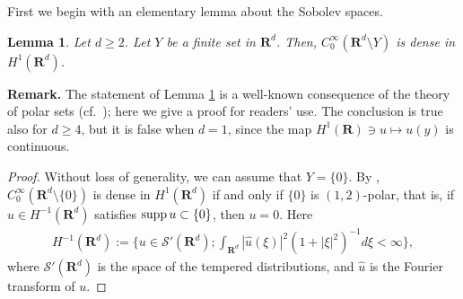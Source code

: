 \documentclass[12pt,a4paper]{article}
\newtheorem{lemma}[theorem]{Lemma}
\def\supp{\mathop{\rm supp}\nolimits}
\begin{document}
First we begin with an elementary lemma
about the Sobolev spaces.
\begin{lemma}
\label{lemma_density}
 Let $d\geq2$.
Let $Y$ be a finite set in $\mathbf{R}^d$.
Then, $C_0^\infty(\mathbf{R}^d\setminus Y)$
is dense in $H^1(\mathbf{R}^d)$.
\end{lemma}
\noindent\textbf{Remark.}
The statement of Lemma \ref{lemma_density} is a well-known consequence of 
the theory of polar sets (cf.\ \cite{Ad});
here we give a proof for readers' use.
The conclusion is true also for $d\geq 4$,
but it is false when $d=1$,
since the map $H^1(\mathbf{R})\ni u\mapsto u(y)$ is continuous.
\begin{proof}
Without loss of generality, we can assume that $Y=\{0\}$.
By \cite[Theorem 3.23]{Ad},
$C_0^\infty(\mathbf{R}^d\setminus\{0\})$ is dense in 
$H^1(\mathbf{R}^d)$ if and only if $\{0\}$ is $(1,2)$-polar,
that is,
if $u\in H^{-1}(\mathbf{R}^d)$ satisfies $\supp u\subset \{0\}$,
then $u=0$.
Here
\begin{align*}
 H^{-1}(\mathbf{R}^d)
:=
\{u\in \mathcal{S}'(\mathbf{R}^d); 
\int_{\mathbf{R}^d}|\hat{u}(\xi)|^2(1+|\xi|^2)^{-1}d\xi<\infty\},
\end{align*}
where $\mathcal{S}'(\mathbf{R}^d)$ is the space of the tempered distributions,
and $\hat{u}$ is the Fourier transform of $u$.


\end{proof}
\end{document}

